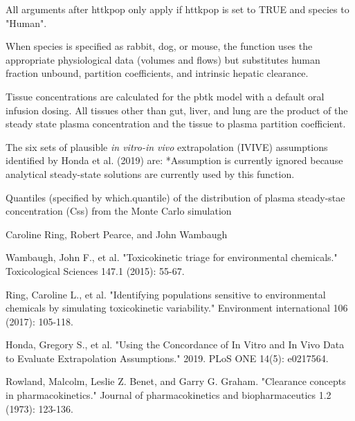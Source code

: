 \documentclass[a4paper]{book}
\begin{document}
%
\begin{Details}\relax
All arguments after httkpop only apply if httkpop is set to TRUE and species
to "Human".

When species is specified as rabbit, dog, or mouse, the function uses the
appropriate physiological data (volumes and flows) but substitutes human
fraction unbound, partition coefficients, and intrinsic hepatic clearance.

Tissue concentrations are calculated for the pbtk model with a default oral
infusion dosing. All tissues other than gut, liver, and lung are the product
of the steady state plasma concentration and the tissue to plasma partition
coefficient.

The six sets of plausible \emph{in vitro-in vivo} extrapolation (IVIVE)
assumptions identified by Honda et al. (2019) are: 
 *Assumption is
currently ignored because analytical steady-state solutions are currently
used by this function.
\end{Details}
%
\begin{Value}
Quantiles (specified by which.quantile) of the distribution of plasma
steady-stae concentration (Css) from the Monte Carlo simulation
\end{Value}
%
\begin{Author}\relax
Caroline Ring, Robert Pearce, and John Wambaugh
\end{Author}
%
\begin{References}\relax
Wambaugh, John F., et al. "Toxicokinetic triage for 
environmental chemicals." Toxicological Sciences 147.1 (2015): 55-67.

Ring, Caroline L., et al. "Identifying populations sensitive to
environmental chemicals by simulating toxicokinetic variability."
Environment international 106 (2017): 105-118. 

Honda, Gregory S., et al. "Using the Concordance of In Vitro and 
In Vivo Data to Evaluate Extrapolation Assumptions." 2019. PLoS ONE 14(5): e0217564.

Rowland, Malcolm, Leslie Z. Benet, and Garry G. Graham. "Clearance concepts in 
pharmacokinetics." Journal of pharmacokinetics and biopharmaceutics 1.2 (1973): 123-136.
\end{References}
\end{document}

